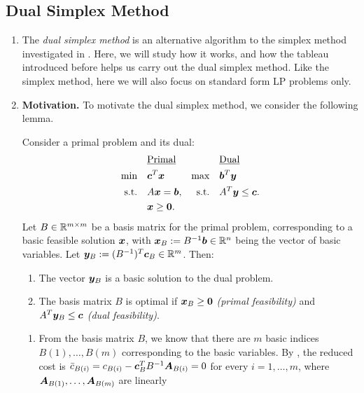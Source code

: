 \subsection{Dual Simplex Method}
\label{subsect:dual-simplex-method}
\begin{enumerate}
\item The \emph{dual simplex method} is an alternative algorithm to the simplex
method investigated in . Here, we will study how it
works, and how the tableau introduced before helps us carry out the dual
simplex method. Like the simplex method, here we will also focus on standard
form LP problems only.
\item \textbf{Motivation.} To motivate the dual simplex method, we consider the
following lemma.
\begin{lemma}
\label{lma:optim-prim-feas-dual-feas}
Consider a primal problem and its dual:
\begin{align*}
&\text{\underline{Primal}}&&\text{\underline{Dual}} \\
\text{min}\quad&\bm{c}^{T}\bm{x}&\text{max}\quad&\bm{b}^{T}\bm{y} \\
\text{s.t.}\quad&A\bm{x}=\bm{b},&\text{s.t.}\quad&A^{T}\bm{y}\le\bm{c}. \\
\quad&\bm{x}\ge\bm{0}.
\end{align*}
Let \(B\in\mathbb{R}^{m\times m}\) be a basis matrix for the primal problem,
corresponding to a basic feasible solution \(\bm{x}\), with
\(\bm{x}_{B}:=B^{-1}\bm{b}\in\mathbb{R}^n\) being the vector of basic variables.
Let \(\bm{y}_{B}:=(B^{-1})^{T}\bm{c}_{B}\in\mathbb{R}^m\). Then:
\begin{enumerate}
\item The vector \(\bm{y}_{B}\) is a basic solution to the dual problem.
\item The basis matrix \(B\) is optimal if \(\bm{x}_{B}\ge\bm{0}\)
\emph{(primal feasibility)} and \(A^{T}\bm{y}_{B}\le\bm{c}\) \emph{(dual
feasibility)}.
\end{enumerate}
\end{lemma}
\begin{pf}
\begin{enumerate}
\item From the basis matrix \(B\), we know that there are \(m\) basic indices
\(B(1),\dotsc,B(m)\) corresponding to the basic variables. By
, the reduced cost is
\(\bar{c}_{B(i)}=c_{B(i)}-\bm{c}_{B}^{T}B^{-1}\bm{A}_{B(i)}=0\) for every
\(i=1,\dotsc,m\), where \(\bm{A}_{B(1)},\dotsc,\bm{A}_{B(m)}\) are linearly

\end{enumerate}
\end{pf}
\end{enumerate}
